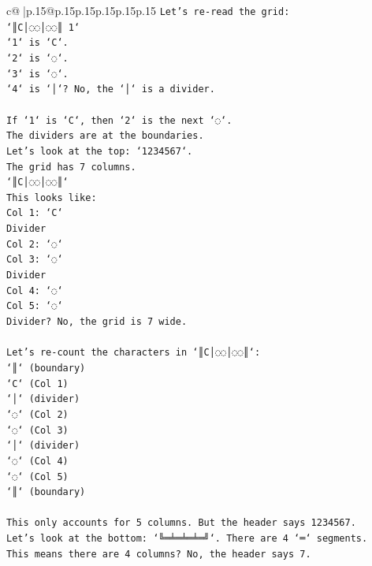 \documentclass{article}
\begin{document}
{\begin{supertabular}{c@{$\;$}|p{.15\linewidth}@{}p{.15\linewidth}p{.15\linewidth}p{.15\linewidth}p{.15\linewidth}p{.15\linewidth}}
{{{\texttt{Let's re{-}read the grid:} \\
\texttt{`║C│◌◌│◌◌║ 1`} \\
\texttt{`1` is `C`.} \\
\texttt{`2` is `◌`.} \\
\texttt{`3` is `◌`.} \\
\texttt{`4` is `│`? No, the `│` is a divider.} \\
\\ 
\texttt{If `1` is `C`, then `2` is the next `◌`.} \\
\texttt{The dividers are at the boundaries.} \\
\texttt{Let's look at the top: `1234567`.} \\
\texttt{The grid has 7 columns.} \\
\texttt{`║C│◌◌│◌◌║`} \\
\texttt{This looks like:} \\
\texttt{Col 1: `C`} \\
\texttt{Divider} \\
\texttt{Col 2: `◌`} \\
\texttt{Col 3: `◌`} \\
\texttt{Divider} \\
\texttt{Col 4: `◌`} \\
\texttt{Col 5: `◌`} \\
\texttt{Divider? No, the grid is 7 wide.} \\
\\ 
\texttt{Let's re{-}count the characters in `║C│◌◌│◌◌║`:} \\
\texttt{`║` (boundary)} \\
\texttt{`C` (Col 1)} \\
\texttt{`│` (divider)} \\
\texttt{`◌` (Col 2)} \\
\texttt{`◌` (Col 3)} \\
\texttt{`│` (divider)} \\
\texttt{`◌` (Col 4)} \\
\texttt{`◌` (Col 5)} \\
\texttt{`║` (boundary)} \\
\\ 
\texttt{This only accounts for 5 columns. But the header says 1234567.} \\
\texttt{Let's look at the bottom: `╚═╧═╧═╧═╝`. There are 4 `═` segments.} \\
\texttt{This means there are 4 columns? No, the header says 7.} \\
\\ 
}}}
\end{supertabular}}
\end{document}
